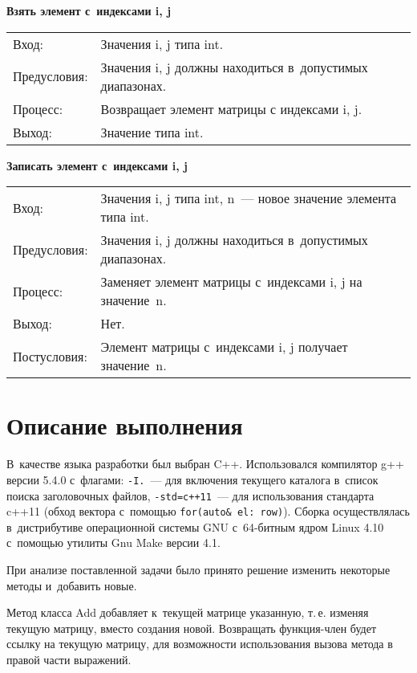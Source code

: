 \documentclass[a4paper,14pt]{extreport}
\begin{document}
\noindent
\begin{minipage}{\textwidth}
	\vspace{1em}
	{\bf Взять элемент с индексами i, j}
	\flushright
	\begin{tabularx}{.95\textwidth}{lX}
		Вход: & Значения i, j типа int.\\
		Предусловия: & Значения i, j должны находиться в допустимых диапазонах.\\
		Процесс: & Возвращает элемент матрицы с индексами i, j.\\
		Выход: & Значение типа int.\\
	\end{tabularx}
\end{minipage}

\noindent
\begin{minipage}{\textwidth}
	\vspace{1em}
	{\bf Записать элемент с индексами i, j}
	\flushright
	\begin{tabularx}{.95\textwidth}{lX}
		Вход: & Значения i, j типа int, n — новое значение элемента типа int.\\
		Предусловия: & Значения i, j должны находиться в допустимых диапазонах.\\
		Процесс: & Заменяет элемент матрицы с индексами i, j на значение n.\\
		Выход: & Нет.\\
		Постусловия: & Элемент матрицы с индексами i, j получает значение n.
	\end{tabularx}
\end{minipage}

\chapter*{Описание выполнения}
	\label{chapter:intro}
В качестве языка разработки был выбран C++.
Использовался компилятор g++ версии 5.4.0 с флагами:
{\tt -I.} — для включения текущего каталога в список поиска заголовочных файлов,
{\tt -std=c++11} — для использования стандарта c++11 (обход вектора с помощью \lstinline[basicstyle=\normalsize\ttfamily]{for(auto& el: row)}).
Сборка осуществлялась в дистрибутиве операционной системы GNU с 64-битным ядром Linux 4.10 с помощью утилиты Gnu Make версии 4.1.

При анализе поставленной задачи было принято решение изменить некоторые методы и добавить новые.

Метод класса Add добавляет к текущей матрице указанную, \mbox{т.\,е.} изменяя текущую матрицу, вместо создания новой.
Возвращать функция-член будет ссылку на текущую матрицу, для возможности использования вызова метода в правой части выражений.
\end{document}
